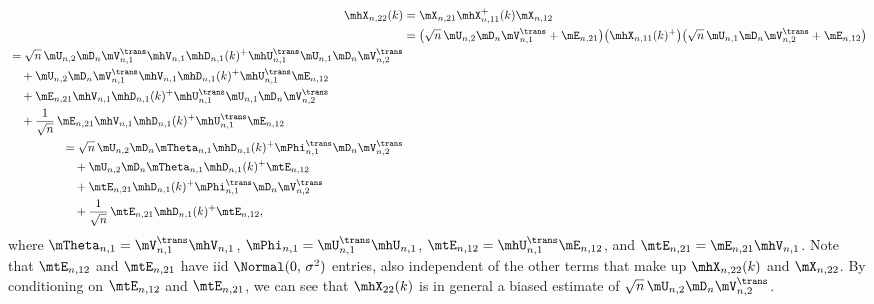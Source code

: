 \begin{align}
    \mhX_{n,22}(k)
        &=
            \mX_{n,21} \mhX_{n,11}^{+}(k) \mX_{n,12} \notag \\
        &=
            \big(
                \sqrt{n} \, \mU_{n,2} \mD_n \mV_{n,1}^\trans 
                + \mE_{n,21}
            \big)
            \big(
                \mhX_{n,11}(k)^+
            \big)
            \big(
                \sqrt{n} \, \mU_{n,1} \mD_n \mV_{n,2}^\trans 
                + \mE_{n,12}
            \big) \notag \\
    \begin{split}
        &= 
            \sqrt{n} \, \mU_{n,2} \mD_n \mV_{n,1}^\trans
                \mhV_{n,1} \mhD_{n,1}(k)^+ \mhU_{n,1}^\trans
                \mU_{n,1} \mD_n \mV_{n,2}^\trans \\
        &\quad+
            \mU_{n,2} \mD_n \mV_{n,1}^\trans
                \mhV_{n,1} \mhD_{n,1}(k)^+ \mhU_{n,1}^\trans
                \mE_{n,12} \\
        &\quad+
            \mE_{n,21}
                \mhV_{n,1} \mhD_{n,1}(k)^+ \mhU_{n,1}^\trans
                \mU_{n,1} \mD_n \mV_{n,2}^\trans \\
        &\quad+
            \frac{1}{\sqrt{n}} \, \mE_{n,21}
                \mhV_{n,1} \mhD_{n,1}(k)^+ \mhU_{n,1}^\trans
                \mE_{n,12}
    \end{split} \notag \\
    \begin{split}
        &=
            \sqrt{n} \, 
                \mU_{n,2} \mD_n 
                \mTheta_{n,1} \mhD_{n,1}(k)^+ \mPhi_{n,1}^\trans
                \mD_n \mV_{n,2}^\trans \\
        &\quad+
            \mU_{n,2} \mD_n \mTheta_{n,1} \mhD_{n,1}(k)^+ \mtE_{n,12} \\
        &\quad+
            \mtE_{n,21} 
                \mhD_{n,1}(k)^+ \mPhi_{n,1}^\trans \mD_n \mV_{n,2}^\trans \\
        &\quad+
            \frac{1}{\sqrt{n}} \, \mtE_{n,21} \mhD_{n,1}(k)^+ \mtE_{n,12},
    \end{split}
\end{align}
where 
$\mTheta_{n,1} = \mV_{n,1}^\trans \mhV_{n,1}$,
$\mPhi_{n,1}   = \mU_{n,1}^\trans \mhU_{n,1}$,
$\mtE_{n,12} = \mhU_{n,1}^\trans \mE_{n,12}$, and
$\mtE_{n,21} = \mE_{n,21} \mhV_{n,1}$.  Note that $\mtE_{n,12}$ and $\mtE_{n,21}$ have iid $\Normal( 0 ,\, \sigma^2 )$ entries, also independent of the other terms that make up $\mhX_{n,22}(k)$ and $\mX_{n,22}$.  By conditioning on $\mtE_{n,12}$ and $\mtE_{n,21}$, we can see that $\mhX_{22}(k)$ is in general a biased estimate of $\sqrt{n} \, \mU_{n,2} \mD_n \mV_{n,2}^\trans$.

